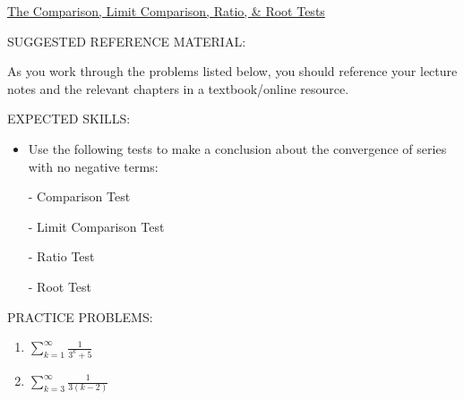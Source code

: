 \documentclass[12pt]{article}
\newif\ifans
\begin{document}
\begin{center}
\underline{\LARGE{The Comparison, Limit Comparison, Ratio, \& Root Tests}}
\end{center}

\noindent SUGGESTED REFERENCE MATERIAL:

\medskip

\noindent As you work through the problems listed below, you should reference your lecture notes and the relevant chapters in a textbook/online resource.

\medskip

\noindent EXPECTED SKILLS:

\medskip

\begin{itemize}[topsep=0pt]

\item Use the following tests to make a conclusion about the convergence of series with no negative terms:

- Comparison Test 

- Limit Comparison Test 

- Ratio Test 

- Root Test 

\end{itemize}

\medskip

\noindent PRACTICE PROBLEMS:

\medskip


\begin{enumerate}

\item $\sum_{k=1}^{\infty}{\frac{1}{3^k+5}}$

\ifans{\fbox{\parbox{1\linewidth}{$\frac{1}{3^k+5}<\frac{1}{3^k}$ for $k\geq1$.  \\ \\ Since $\sum_{k=1}^{\infty}{\frac{1}{3^k}}$ converges (geometric series, $\textstyle r=\frac{1}{3}$), $\sum_{k=1}^{\infty}{\frac{1}{3^k+5}}$ must converge.}}} \fi

\item $\sum_{k=3}^{\infty}{\frac{1}{3(k-2)}}$

\ifans{\fbox{\parbox{1\linewidth}{$\frac{1}{3(k-2)}=\frac{1}{3k-6}>\frac{1}{3k}$ for $k\geq3$.  \\ \\ Since $\sum_{k=3}^{\infty}{\frac{1}{3k}}$ diverges ($p$-series with $p=1$), $\sum_{k=3}^{\infty}{\frac{1}{3(k-2)}}$ must diverge as well.}}} \fi

\end{enumerate}
\end{document}

